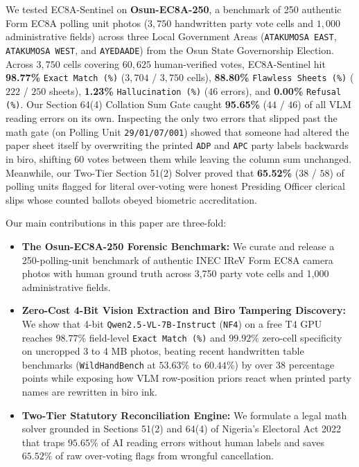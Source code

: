\documentclass{article}
\begin{document}
We tested EC8A-Sentinel on \textbf{Osun-EC8A-250}, a benchmark of 250 authentic Form EC8A polling unit photos ($3,750$ handwritten party vote cells and $1,000$ administrative fields) across three Local Government Areas (\texttt{ATAKUMOSA EAST}, \texttt{ATAKUMOSA WEST}, and \texttt{AYEDAADE}) from the Osun State Governorship Election. Across $3,750$ cells covering $60,625$ human-verified votes, EC8A-Sentinel hit \textbf{98.77\%} \texttt{Exact Match (\%)} ($3,704$ / $3,750$ cells), \textbf{88.80\%} \texttt{Flawless Sheets (\%)} ($222$ / $250$ sheets), \textbf{1.23\%} \texttt{Hallucination (\%)} ($46$ errors), and \textbf{0.00\%} \texttt{Refusal (\%)}. Our Section 64(4) Collation Sum Gate caught \textbf{95.65\%} ($44$ / $46$) of all VLM reading errors on its own. Inspecting the only two errors that slipped past the math gate (on Polling Unit \texttt{29/01/07/001}) showed that someone had altered the paper sheet itself by overwriting the printed \texttt{ADP} and \texttt{APC} party labels backwards in biro, shifting $60$ votes between them while leaving the column sum unchanged. Meanwhile, our Two-Tier Section 51(2) Solver proved that \textbf{65.52\%} ($38$ / $58$) of polling units flagged for literal over-voting were honest Presiding Officer clerical slips whose counted ballots obeyed biometric accreditation.

Our main contributions in this paper are three-fold:
\begin{itemize}
    \item \textbf{The Osun-EC8A-250 Forensic Benchmark:} We curate and release a 250-polling-unit benchmark of authentic INEC IReV Form EC8A camera photos with human ground truth across 3,750 party vote cells and 1,000 administrative fields.
    \item \textbf{Zero-Cost 4-Bit Vision Extraction and Biro Tampering Discovery:} We show that 4-bit \texttt{Qwen2.5-VL-7B-Instruct} (\texttt{NF4}) on a free T4 GPU reaches $98.77\%$ field-level \texttt{Exact Match (\%)} and $99.92\%$ zero-cell specificity on uncropped 3 to 4 MB photos, beating recent handwritten table benchmarks (\texttt{WildHandBench} at $53.63\%$ to $60.44\%$) by over 38 percentage points while exposing how VLM row-position priors react when printed party names are rewritten in biro ink.
    \item \textbf{Two-Tier Statutory Reconciliation Engine:} We formulate a legal math solver grounded in Sections 51(2) and 64(4) of Nigeria's Electoral Act 2022 that traps $95.65\%$ of AI reading errors without human labels and saves $65.52\%$ of raw over-voting flags from wrongful cancellation.
\end{itemize}
\end{document}
